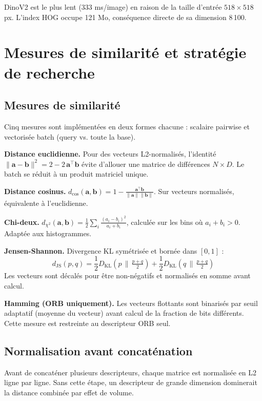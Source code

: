 \documentclass[12pt,a4paper]{report}
\begin{document}
DinoV2 est le plus lent (333 ms/image) en raison de la taille d'entrée $518 \times 518$ px. L'index HOG occupe 121 Mo, conséquence directe de sa dimension 8\,100.

\chapter{Mesures de similarité et stratégie de recherche}

\section{Mesures de similarité}

Cinq mesures sont implémentées en deux formes chacune : scalaire pairwise et vectorisée batch (query vs. toute la base).

\textbf{Distance euclidienne.} Pour des vecteurs L2-normalisés, l'identité $\|\mathbf{a}-\mathbf{b}\|^2 = 2 - 2\,\mathbf{a}^\top\mathbf{b}$ évite d'allouer une matrice de différences $N \times D$. Le batch se réduit à un produit matriciel unique.

\textbf{Distance cosinus.} $d_{\cos}(\mathbf{a},\mathbf{b}) = 1 - \frac{\mathbf{a}^\top\mathbf{b}}{\|\mathbf{a}\|\|\mathbf{b}\|}$. Sur vecteurs normalisés, équivalente à l'euclidienne.

\textbf{Chi-deux.} $d_{\chi^2}(\mathbf{a},\mathbf{b}) = \frac{1}{2}\sum_i \frac{(a_i - b_i)^2}{a_i + b_i}$, calculée sur les bins où $a_i + b_i > 0$. Adaptée aux histogrammes.

\textbf{Jensen-Shannon.} Divergence KL symétrisée et bornée dans $[0,1]$ :
\[
  d_{\text{JS}}(p,q) = \frac{1}{2}D_{\text{KL}}\!\left(p \,\|\, \tfrac{p+q}{2}\right) + \frac{1}{2}D_{\text{KL}}\!\left(q \,\|\, \tfrac{p+q}{2}\right)
\]
Les vecteurs sont décalés pour être non-négatifs et normalisés en somme avant calcul.

\textbf{Hamming (ORB uniquement).} Les vecteurs flottants sont binarisés par seuil adaptatif (moyenne du vecteur) avant calcul de la fraction de bits différents. Cette mesure est restreinte au descripteur ORB seul.

\section{Normalisation avant concaténation}

Avant de concaténer plusieurs descripteurs, chaque matrice est normalisée en L2 ligne par ligne. Sans cette étape, un descripteur de grande dimension dominerait la distance combinée par effet de volume.
\end{document}
